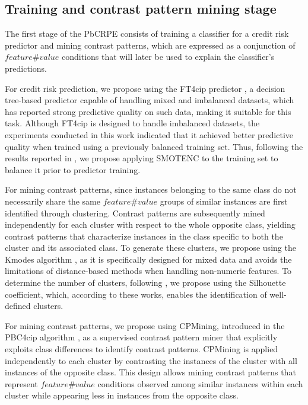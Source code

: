		\subsection{Training and contrast pattern mining stage}
		{\color{blue}
			The first stage of the PbCRPE consists of training a classifier for a credit risk predictor and mining contrast patterns, which are expressed as a conjunction of $feature\#value$ conditions that will later be used to explain the classifier's predictions. \newline 
		}
		
		For credit risk prediction, we propose using the FT4cip predictor \cite{canete2022ft4cip}, a decision tree-based predictor capable of handling mixed and imbalanced datasets, which has reported strong predictive quality on such data, making it suitable for this task. Although FT4cip is designed to handle imbalanced datasets, the experiments conducted in this work indicated that it achieved better predictive quality when trained using a previously balanced training set. Thus, following the results reported in \cite{melchor2025oversampling}, we propose applying SMOTENC \cite{chawla2002smote, mukherjee2021smote} to the training set to balance it prior to predictor training.\newline
		
		{\color{blue}	
		For mining contrast patterns, since instances belonging to the same class do not necessarily share the same $feature\#value$ groups of similar instances are first identified through clustering. Contrast patterns are subsequently mined independently for each cluster with respect to the whole opposite class, yielding contrast patterns that characterize instances in the class specific to both the cluster and its associated class. To generate these clusters, we propose using the Kmodes algorithm \cite{huang1997clustering, huang1998extensions}, as it is specifically designed for mixed data and avoids the limitations of distance-based methods when handling non-numeric features. To determine the number of clusters, following \cite{dinh2019estimating, kuswardana2025comparison}, we propose using the Silhouette coefficient, which, according to these works, enables the identification of well-defined clusters. 
		}\newline 
		
		For mining contrast patterns, we propose using CPMining, introduced in the PBC4cip algorithm \cite{garcia2010lcmine, loyola2017pbc4cip}, as a supervised contrast pattern miner that explicitly exploits class differences to identify contrast patterns. CPMining is applied independently to each cluster by contrasting the instances of the cluster with all instances of the opposite class. This design allows mining contrast patterns that represent $feature\#value$ conditions observed among similar instances within each cluster while appearing less in instances from the opposite class.\newline
		
